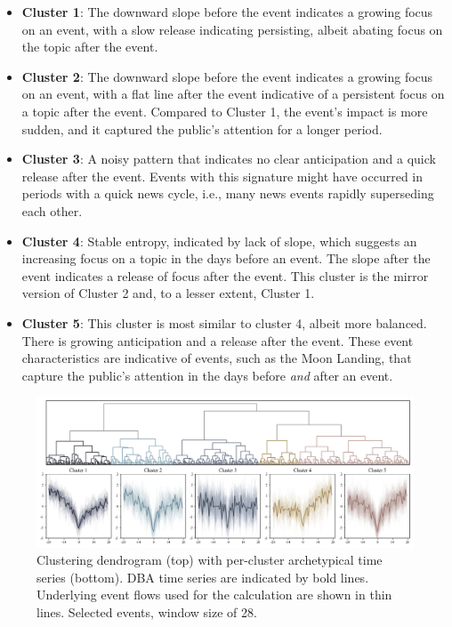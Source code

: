 \documentclass[]{ceurart}
\begin{document}
\begin{itemize}
    \item \textbf{Cluster 1}: The downward slope before the event indicates a growing focus on an event, with a slow release indicating persisting, albeit abating focus on the topic after the event.
    \item \textbf{Cluster 2}: The downward slope before the event indicates a growing focus on an event, with a flat line after the event indicative of a persistent focus on a topic after the event. Compared to Cluster 1, the event's impact is more sudden, and it captured the public's attention for a longer period. 
    \item \textbf{Cluster 3}: A noisy pattern that indicates no clear anticipation and a quick release after the event. Events with this signature might have occurred in periods with a quick news cycle, i.e., many news events rapidly superseding each other.
    \item \textbf{Cluster 4}: Stable entropy, indicated by lack of slope, which suggests an increasing focus on a topic in the days before an event. The slope after the event indicates a release of focus after the event. This cluster is the mirror version of Cluster 2 and, to a lesser extent, Cluster 1. 
    \item \textbf{Cluster 5}: This cluster is most similar to cluster 4, albeit more balanced. There is growing anticipation and a release after the event. These event characteristics are indicative of events, such as the Moon Landing, that capture the public's attention in the days before \emph{and} after an event.
\end{itemize}

\begin{figure}
    \centering
    \includegraphics[width=\linewidth]{figures/img8.png}
    \caption{Clustering dendrogram (top) with per-cluster archetypical time series (bottom). DBA time series are indicated by bold lines. Underlying event flows used for the calculation are shown in thin lines. Selected events, window size of 28.}
    \label{fig:event_flow_clusters}
\end{figure}
\end{document}
